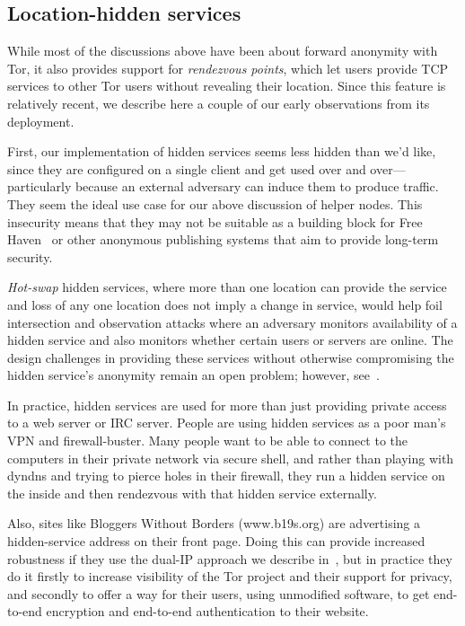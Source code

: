 \documentclass{llncs}
\begin{document}

\subsection{Location-hidden services}
\label{subsec:hidden-services}

While most of the discussions above have been about forward anonymity
with Tor, it also provides support for \emph{rendezvous points}, which
let users provide TCP services to other Tor users without revealing
their location. Since this feature is relatively recent, we describe here
a couple of our early observations from its deployment.

First, our implementation of hidden services seems less hidden than we'd
like, since they are configured on a single client and get used over
and over---particularly because an external adversary can induce them to
produce traffic. They seem the ideal use case for our above discussion
of helper nodes. This insecurity means that they may not be suitable as
a building block for Free Haven~\cite{freehaven-berk} or other anonymous
publishing systems that aim to provide long-term security.

\emph{Hot-swap} hidden services, where more than one location can
provide the service and loss of any one location does not imply a
change in service, would help foil intersection and observation attacks
where an adversary monitors availability of a hidden service and also
monitors whether certain users or servers are online. The design
challenges in providing these services without otherwise compromising
the hidden service's anonymity remain an open problem;
however, see~\cite{move-ndss05}.

In practice, hidden services are used for more than just providing private
access to a web server or IRC server. People are using hidden services
as a poor man's VPN and firewall-buster. Many people want to be able
to connect to the computers in their private network via secure shell,
and rather than playing with dyndns and trying to pierce holes in their
firewall, they run a hidden service on the inside and then rendezvous
with that hidden service externally.

Also, sites like Bloggers Without Borders (www.b19s.org) are advertising
a hidden-service address on their front page. Doing this can provide
increased robustness if they use the dual-IP approach we describe
in~\cite{tor-design},
but in practice they do it firstly to increase visibility
of the Tor project and their support for privacy, and secondly to offer
a way for their users, using unmodified software, to get end-to-end
encryption and end-to-end authentication to their website.
\end{document}
